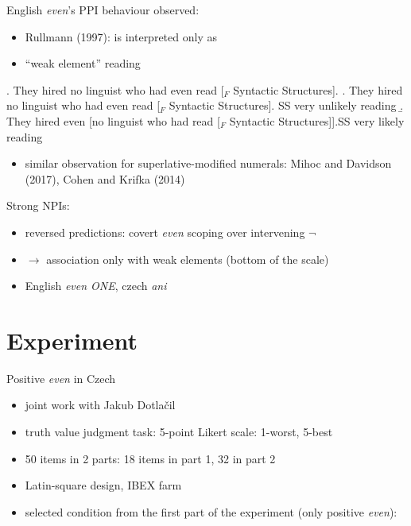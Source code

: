\documentclass[ignorenonframetext,]{beamer}
\providecommand{\tightlist}{%
  \setlength{\itemsep}{0pt}\setlength{\parskip}{0pt}}
\begin{document}
\begin{frame}

English \emph{even}'s PPI behaviour observed:

\begin{itemize}
\tightlist
\item
  Rullmann (1997): \Next is interpreted only as \Next[b]  
\item
  ``weak element'' reading
\end{itemize}

\ex. They hired no linguist who had even read {[}\(_F\) Syntactic
Structures{]}. \a. They hired no linguist who had even read {[}\(_F\)
Syntactic Structures{]}. \hfill SS very unlikely reading \b. They hired
even {[}no linguist who had read {[}\(_F\) Syntactic
Structures{]}{]}.\hfill SS very likely reading

\begin{itemize}
\tightlist
\item
  similar observation for superlative-modified numerals: Mihoc and
  Davidson (2017), Cohen and Krifka (2014)
\end{itemize}

\end{frame}

\begin{frame}

Strong NPIs:

\begin{itemize}
\tightlist
\item
  reversed predictions: covert \emph{even} scoping over intervening
  \(\neg\)
\item
  \(\rightarrow\) association only with weak elements (bottom of the
  scale)
\item
  English \emph{even ONE}, czech \emph{ani}
\end{itemize}

\end{frame}

\begin{frame}

\end{frame}

\section{Experiment}\label{experiment}

\begin{frame}{Positive \emph{even} in Czech}

\begin{itemize}
\tightlist
\item
  joint work with Jakub Dotlačil 
\item
  truth value judgment task: 5-point Likert scale: 1-worst, 5-best
\item
  50 items in 2 parts: 18 items in part 1, 32 in part 2
\item
  Latin-square design, IBEX farm
\item
  selected condition from the first part of the experiment (only
  positive \emph{even}):
\end{itemize}

\end{frame}
\end{document}
